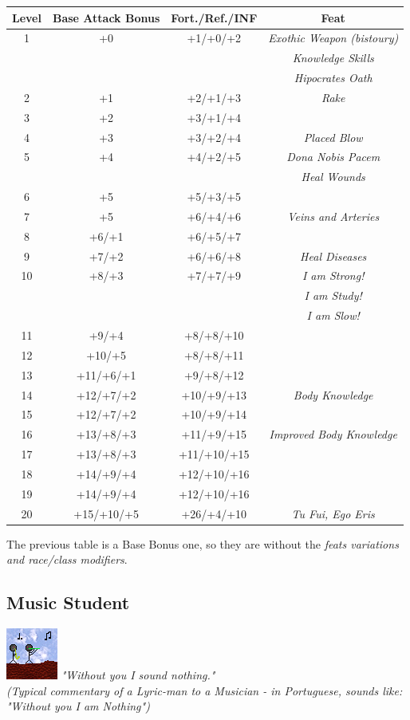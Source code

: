 \documentclass[ letterpaper,12pt]{article}
\begin{document}
\begin{center} \begin{tabular}{|c||c|c|c|}
\hline
{\bf Level}&{\bf Base Attack Bonus}&{\bf Fort./Ref./INF}&{\bf Feat}\\
\hline
1&+0&+1/+0/+2&{\it Exothic Weapon (bistoury)}\\
&&&{\it Knowledge Skills}\\
&&&{\it Hipocrates Oath}\\
\hline
2&+1&+2/+1/+3&{\it Rake}\\
\hline
3&+2&+3/+1/+4&\\
\hline
4&+3&+3/+2/+4&{\it Placed Blow}\\
\hline
5&+4&+4/+2/+5&{\it Dona Nobis Pacem}\\
&&&{\it Heal Wounds}\\
\hline
6&+5&+5/+3/+5&\\
\hline
7&+5&+6/+4/+6&{\it Veins and Arteries}\\
\hline
8&+6/+1&+6/+5/+7&\\
\hline
9&+7/+2&+6/+6/+8&{\it Heal Diseases}\\
\hline
10&+8/+3&+7/+7/+9&{\it I am Strong!}\\
&&&{\it I am Study!}\\
&&&{\it I am Slow!}\\
\hline
11&+9/+4&+8/+8/+10&\\
\hline
12&+10/+5&+8/+8/+11&\\
\hline
13&+11/+6/+1&+9/+8/+12&\\
\hline
14&+12/+7/+2&+10/+9/+13&{\it Body Knowledge}\\
\hline
15&+12/+7/+2&+10/+9/+14&\\
\hline
16&+13/+8/+3&+11/+9/+15&{\it Improved Body Knowledge}\\
\hline
17&+13/+8/+3&+11/+10/+15&\\
\hline
18&+14/+9/+4&+12/+10/+16&\\
\hline
19&+14/+9/+4&+12/+10/+16&\\
\hline
20&+15/+10/+5&+26/+4/+10&{\it Tu Fui, Ego Eris}\\
\hline
\end{tabular} \end{center}

The previous table is a Base Bonus one, so they are without the {\it feats variations and race/class modifiers}.\\

\subsection{Music Student}
\includegraphics{../data/classes/Img/musica.png}
{\it "Without you I sound nothing."\\
     (Typical commentary of a Lyric-man to a Musician - in Portuguese, sounds like: "Without you I am Nothing")}\\
\end{document}
